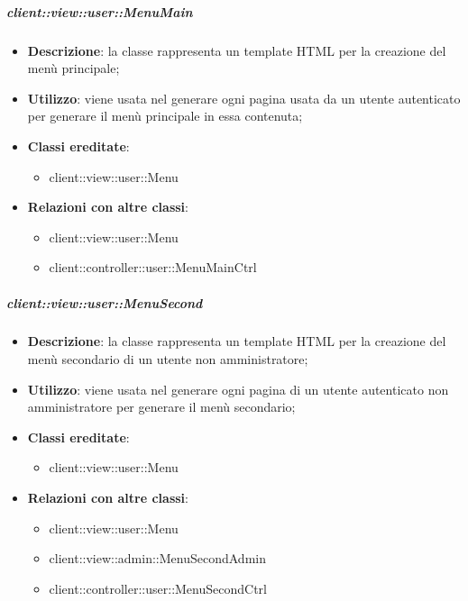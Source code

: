 		\subparagraph{client::view::user::MenuMain} %
		\label{subp:bdsm_app_client_view_user_menumain}
			\begin{itemize}
				\item \textbf{Descrizione}: la classe rappresenta un template HTML per la creazione del menù principale;
				\item \textbf{Utilizzo}: viene usata nel generare ogni pagina usata da un utente autenticato per generare il menù principale in essa contenuta;
				\item \textbf{Classi ereditate}:
					\begin{itemize}
						\item client::view::user::Menu
					\end{itemize}
				\item \textbf{Relazioni con altre classi}:
					\begin{itemize}
						\item client::view::user::Menu
						\item client::controller::user::MenuMainCtrl
					\end{itemize}
			\end{itemize}

		\subparagraph{client::view::user::MenuSecond} %
		\label{subp:bdsm_app_client_view_user_menusecond}
			\begin{itemize}
				\item \textbf{Descrizione}: la classe rappresenta un template HTML per la creazione del menù secondario di un utente non amministratore;
				\item \textbf{Utilizzo}: viene usata nel generare ogni pagina di un utente autenticato non amministratore per generare il menù secondario;
				\item \textbf{Classi ereditate}:
					\begin{itemize}
						\item client::view::user::Menu
					\end{itemize}
				\item \textbf{Relazioni con altre classi}:
					\begin{itemize}
						\item client::view::user::Menu
						\item client::view::admin::MenuSecondAdmin
						\item client::controller::user::MenuSecondCtrl
					\end{itemize}
			\end{itemize}


